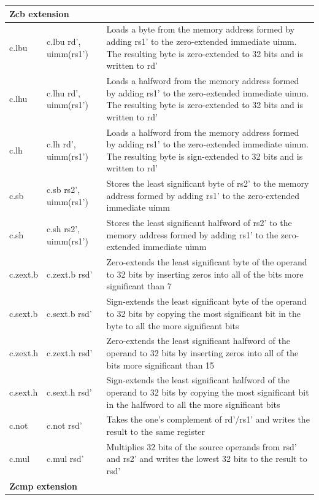 \documentclass[main\_\_EN.tex]{subfiles}
\begin{document}
\begin{longtable}{ | p{2.0cm} | p{4.0cm} |  p{10.0cm} | }
\multicolumn{3}{|l|}{\textbf{Zcb extension}} \\\hline
c.lbu & c.lbu rd', uimm(rs1') & Loads a byte from the memory address formed by adding rs1' to the zero-extended immediate uimm. The resulting byte is zero-extended to 32 bits and is written to rd' \\\hline
c.lhu & c.lhu rd', uimm(rs1') &  Loads a halfword from the memory address formed by adding rs1' to the zero-extended immediate uimm. The resulting byte is zero-extended to 32 bits and is written to rd'\\\hline
c.lh & c.lh rd', uimm(rs1') & Loads a halfword from the memory address formed by adding rs1' to the zero-extended immediate uimm. The resulting byte is sign-extended to 32 bits and is written to rd' \\\hline
c.sb & c.sb rs2', uimm(rs1') & Stores the least significant byte of rs2' to the memory address formed by adding rs1' to the zero-extended immediate uimm \\\hline
c.sh & c.sh rs2', uimm(rs1') &  Stores the least significant halfword of rs2' to the memory address formed by adding rs1' to the zero-extended immediate uimm \\\hline
c.zext.b & c.zext.b rsd' & Zero-extends the least significant byte of the operand to 32 bits by inserting zeros into all of the bits more significant than 7 \\\hline
c.sext.b & c.sext.b rsd' & Sign-extends the least significant byte of the operand to 32 bits by copying the most significant bit in the byte to all the more significant bits   \\\hline
c.zext.h & c.zext.h rsd' &  Zero-extends the least significant halfword of the operand to 32 bits by inserting zeros into all of the bits more significant than 15 \\\hline
c.sext.h  & c.sext.h rsd'  &  Sign-extends the least significant halfword of the operand to 32 bits by copying the most significant bit in the halfword to all the more significant bits \\\hline
c.not & c.not rsd' & Takes the one's complement of rd'/rs1' and writes the result to the same register \\\hline
c.mul & c.mul rsd' & Multiplies 32 bits of the source operands from rsd' and rs2' and writes the lowest 32 bits to the result to rsd'\\\hline

\multicolumn{3}{|l|}{\textbf{Zcmp extension}} \\\hline


\end{longtable}
\end{document}
